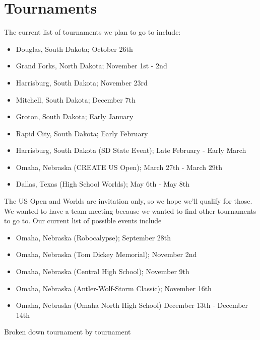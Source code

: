 \section*{Tournaments}
The current list of tournaments we plan to go to include:
\begin{itemize}
    \item Douglas, South Dakota; October 26th
    \item Grand Forks, North Dakota; November 1st - 2nd
    \item Harrisburg, South Dakota; November 23rd
    \item Mitchell, South Dakota; December 7th 
    \item Groton, South Dakota; Early January 
    \item Rapid City, South Dakota; Early February 
    \item Harrisburg, South Dakota (SD State Event); Late February - Early March
    \item Omaha, Nebraska (CREATE US Open); March 27th - March 29th
    \item Dallas, Texas (High School Worlds); May 6th - May 8th
\end{itemize}
The US Open and Worlds are invitation only, so we hope we'll qualify for those. We wanted to have a team meeting because we wanted to find other tournaments to go to. Our current list of possible events include 
\begin{itemize}
    \item Omaha, Nebraska (Robocalypse); September 28th
    \item Omaha, Nebraska (Tom Dickey Memorial); November 2nd
    \item Omaha, Nebraska (Central High School); November 9th 
    \item Omaha, Nebraska (Antler-Wolf-Storm Classic); November 16th
    \item Omaha, Nebraska (Omaha North High School) December 13th - December 14th
\end{itemize}
Broken down tournament by tournament 
